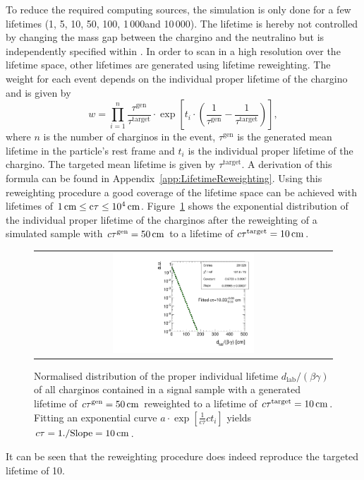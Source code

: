 To reduce the required computing sources, the simulation is only done for a few lifetimes (1\cm, 5\cm, 10\cm, 50\cm, 100\cm, 1\,000\cm and 10\,000\cm).
The lifetime is hereby not controlled by changing the mass gap between the chargino and the neutralino but is independently specified within \geant.
In order to scan in a high resolution over the lifetime space, other lifetimes are generated using lifetime reweighting.
The weight for each event depends on the individual proper lifetime of the chargino and is given by
\begin{equation*}
w = \prod_{i=1}^n \frac{\tau^{\text{gen}}}{\tau^{\text{target}}}\cdot  \exp \left[ t_i \cdot \left( \frac{1}{\tau^{\text{gen}}} - \frac{1}{\tau^{\text{target}}} \right) \right] ,
\end{equation*}
where $n$ is the  number of charginos in the event, $\tau^{\text{gen}}$ is the generated mean lifetime in the particle's rest frame and $t_i$ is the individual proper lifetime of the chargino. 
The targeted mean lifetime is given by $\tau^{\text{target}}$. 
A derivation of this formula can be found in Appendix~\ref{app:LifetimeReweighting}.
Using this reweighting procedure a good coverage of the lifetime space can be achieved with lifetimes of $1\,\text{cm} \leq \text{c}\tau \leq 10^4 \,\text{cm} $. %
Figure~\ref{fig:LifetimeReweighting} shows the exponential distribution of the individual proper lifetime of the charginos after the reweighting of a simulated sample with $c\tau^{\text{gen}}=50\,\text{cm}$ to a lifetime of $c\tau^{\text{target}}=10\,\text{cm}$.
\begin{figure}[!t]
  \centering 
  \begin{tabular}{c}
    \includegraphics[width=0.49\textwidth]{figures/analysis/10cm.pdf}
  \end{tabular}
  \caption{Normalised distribution of the proper individual lifetime $d_{\text{lab}}/\left(\beta\gamma \right)$ of all charginos contained in a signal sample with a generated lifetime of $c\tau^{\text{gen}}=50\,\text{cm}$ reweighted to a lifetime of $c\tau^{\text{target}}=10\,\text{cm}$. Fitting an exponential curve $a\cdot \exp\left[\frac{1}{c \tau } c t_i\right]$ yields $c\tau=1./\text{Slope}=10\,\text{cm}$.}
  \label{fig:LifetimeReweighting}
\end{figure}
It can be seen that the reweighting procedure does indeed reproduce the targeted lifetime of 10\cm.


